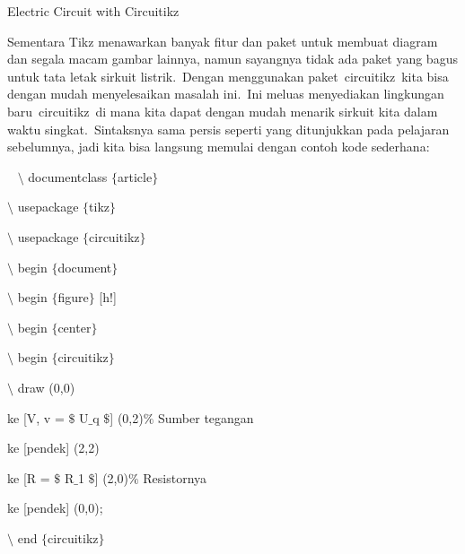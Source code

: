 \sloppy



\noindent 
Electric Circuit with Circuitikz
\par


\noindent 
Sementara Tikz menawarkan banyak fitur dan paket untuk membuat diagram dan segala macam gambar lainnya, namun sayangnya tidak ada paket yang bagus untuk tata letak sirkuit listrik. Dengan menggunakan paket circuitikz kita bisa dengan mudah menyelesaikan masalah ini. Ini meluas menyediakan lingkungan baru circuitikz di mana kita dapat dengan mudah menarik sirkuit kita dalam waktu singkat. Sintaksnya sama persis seperti yang ditunjukkan pada pelajaran sebelumnya, jadi kita bisa langsung memulai dengan contoh kode sederhana:
\par


\noindent 
~ $\setminus$ documentclass $ \{ $article$ \} $
\par


\noindent 
 $\setminus$ usepackage $ \{ $tikz$ \} $
\par


\noindent 
 $\setminus$ usepackage $ \{ $circuitikz$ \} $
\par


\noindent 
 $\setminus$ begin $ \{ $document$ \} $
\par


\noindent 
 $\setminus$ begin $ \{ $figure$ \} $ [h!]
\par


\noindent 
 $\setminus$ begin $ \{ $center$ \} $
\par


\noindent 
 $\setminus$ begin $ \{ $circuitikz$ \} $
\par


\noindent 
 $\setminus$ draw (0,0)
\par


\noindent 
 ke [V, v = $\$$ U$ \_ $q $\$$] (0,2)$\%$ Sumber tegangan
\par


\noindent 
 ke [pendek] (2,2)
\par


\noindent 
 ke [R = $\$$ R$ \_ $1 $\$$] (2,0)$\%$ Resistornya
\par


\noindent 
 ke [pendek] (0,0);
\par


\noindent 
 $\setminus$ end $ \{ $circuitikz$ \} $
\par



